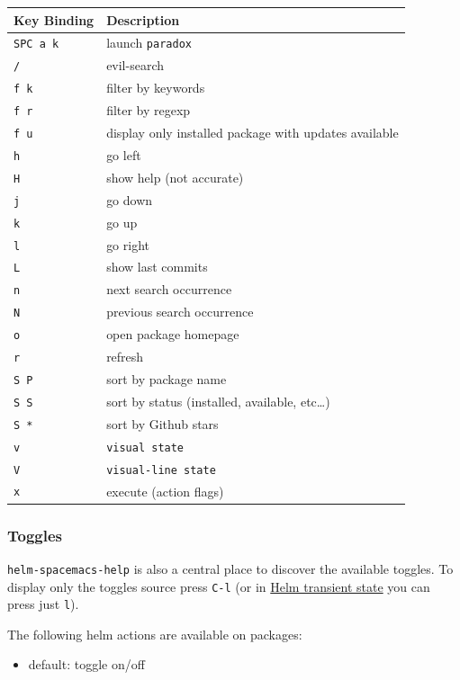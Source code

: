 \documentclass[11pt]{article}
\begin{document}
\begin{enumerate}
\begin{center}
\begin{tabular}{ll}
Key Binding & Description\\
\hline
\texttt{SPC a k} & launch \texttt{paradox}\\
\texttt{/} & evil-search\\
\texttt{f k} & filter by keywords\\
\texttt{f r} & filter by regexp\\
\texttt{f u} & display only installed package with updates available\\
\texttt{h} & go left\\
\texttt{H} & show help (not accurate)\\
\texttt{j} & go down\\
\texttt{k} & go up\\
\texttt{l} & go right\\
\texttt{L} & show last commits\\
\texttt{n} & next search occurrence\\
\texttt{N} & previous search occurrence\\
\texttt{o} & open package homepage\\
\texttt{r} & refresh\\
\texttt{S P} & sort by package name\\
\texttt{S S} & sort by status (installed, available, etc\ldots{})\\
\texttt{S *} & sort by Github stars\\
\texttt{v} & \texttt{visual state}\\
\texttt{V} & \texttt{visual-line state}\\
\texttt{x} & execute (action flags)\\
\end{tabular}
\end{center}
\end{enumerate}

\subsubsection{Toggles}
\label{sec:orgf3cdc9b}
\texttt{helm-spacemacs-help} is also a central place to discover the available toggles.
To display only the toggles source press \texttt{C-l} (or in \hyperref[sec:org70b4995]{Helm transient state} you can
press just \texttt{l}).

The following helm actions are available on packages:
\begin{itemize}
\item default: toggle on/off
\end{itemize}
\end{document}
